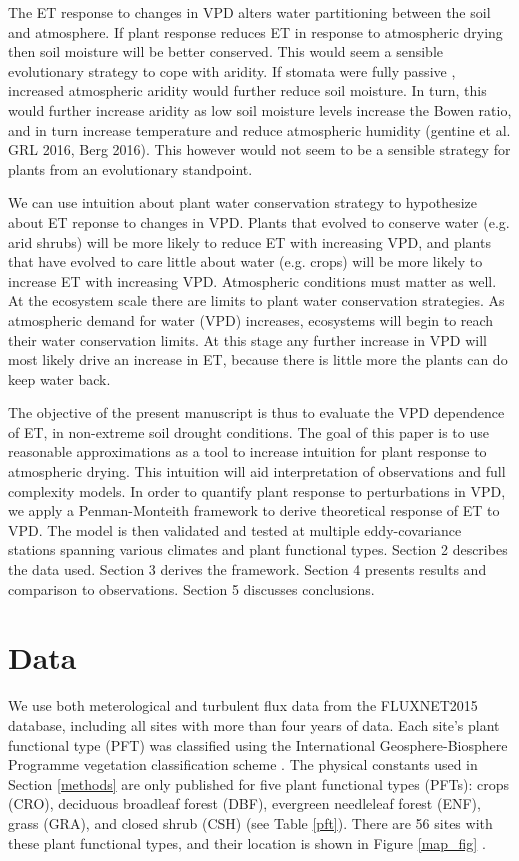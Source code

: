 \documentclass[draft,linenumbers]{agujournal}
\begin{document}
The ET response to changes in VPD alters water partitioning between the soil and atmosphere. If plant response reduces ET in response to atmospheric drying then soil moisture will be better conserved. This would seem a sensible evolutionary strategy to cope with aridity. If stomata were fully passive \citep [similar to soil pores, e.g. ][]{Or_2013}, increased atmospheric aridity would further reduce soil moisture. In turn, this would further increase aridity as low soil moisture levels increase the Bowen ratio, and in turn increase temperature and reduce atmospheric humidity (gentine et al. GRL 2016, Berg 2016).  This however would not seem to be a sensible strategy for plants from an evolutionary standpoint.

We can use intuition about plant water conservation strategy to hypothesize about ET reponse to changes in VPD. Plants that evolved to conserve water (e.g. arid shrubs) will be more likely to reduce ET with increasing VPD, and plants that have evolved to care little about water (e.g. crops) will be more likely to increase ET with increasing VPD. Atmospheric conditions must matter as well. At the ecosystem scale there are limits to plant water conservation strategies. As atmospheric demand for water (VPD) increases, ecosystems will begin to reach their water conservation limits. At this stage any further increase in VPD will most likely drive an increase in ET, because there is little more the plants can do keep water back. 

The objective of the present manuscript is thus to evaluate the VPD dependence of ET, in non-extreme soil drought conditions. The goal of this paper is to use reasonable approximations as a tool to increase intuition for plant response to atmospheric drying. This intuition will aid interpretation of observations and full complexity models. In order to quantify plant response to perturbations in VPD, we apply a Penman-Monteith framework to derive theoretical response of ET to VPD. The model is then validated and tested at multiple eddy-covariance stations spanning various climates and plant functional types. Section 2 describes the data used. Section 3 derives the framework. Section 4 presents results and comparison to observations. Section 5 discusses conclusions. 

\section{Data}
\label{data}
We use both meterological and turbulent flux data from the FLUXNET2015 database, including all sites with more than four years of data. Each site's plant functional type (PFT) was classified using the International Geosphere-Biosphere Programme vegetation classification scheme \citep{Loveland_1999}. The physical constants used in Section \ref{methods} are only published for five plant functional types (PFTs): crops (CRO), deciduous broadleaf forest (DBF), evergreen needleleaf forest (ENF), grass (GRA), and closed shrub (CSH) (see Table \ref{pft}). There are 56 sites with these plant functional types, and their location is shown in  Figure \ref{map_fig} .
\end{document}
